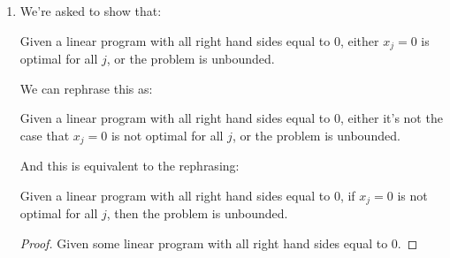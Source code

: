 \documentclass[12pt,letterpaper]{article}
\begin{document}
\begin{enumerate}
\begin{proof}
        If $x_k, k \in B$ is chosen to leave the basis and become non-basic,
        and $x_l, l \in N$ is chosen to enter the basis and become basic.

        Then we know that $\overline{c}_l > 0$, otherwise $x_l$ would not be chosen to enter the basis.

        We also know that $x_l = \overline{b}_l - \ldots - \overline{c}_{lk}x_k - \ldots$.

        When we go to pivot in the objective function $\zeta$, we substitute this new value for $x_l$.

        We end up with $\zeta = \overline{\zeta} + \ldots + \overline{c}_l\left(\overline{b}_l - \ldots - \overline{c}_{lk}x_k - \ldots\right) + \ldots$.

        After simplification, and letting $\overline{c}_{lk}' = \overline{c}_l\overline{c}_{lk}$, we have

        $\zeta = \overline{\zeta}' + \ldots - \overline{c}_{lk}'x_k + \ldots$

        Since $-\overline{c}_{lk}' < 0$, it will not be chosen to become basic in the next iteration.

        Since our choice of entering and leaving variables was arbitrary,
        this holds for any such entering and leaving variables.

        Thus, we have shown that
        if a variable becomes non-basic in one iteration,
        then it cannot become basic in the next iteration.
      \end{proof}
    \item
      We're asked to show that:

      Given a linear program with all right hand sides equal to 0,
      either $x_j = 0$ is optimal for all $j$, or the problem is unbounded.

      We can rephrase this as:

      Given a linear program with all right hand sides equal to 0,
      either it's not the case that $x_j = 0$ is not optimal for all $j$, or the problem is unbounded.

      And this is equivalent to the rephrasing:

      Given a linear program with all right hand sides equal to 0,
      if $x_j = 0$ is not optimal for all $j$, then the problem is unbounded.

      \begin{proof}
        Given some linear program with all right hand sides equal to 0.


\end{proof}
\end{enumerate}
\end{document}
